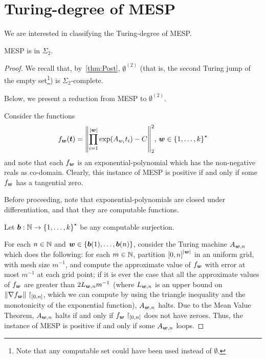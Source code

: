 \section{Turing-degree of MESP}
\label{sec:turing-degree-lics}

We are interested in classifying the Turing-degree of MESP\@.

\begin{theorem}
\label{thm:turing-degree-2}
  MESP is in $\Sigma_{2}$.
\end{theorem}

\begin{proof}
We recall that, by~\cref{thm:Post}, $\emptyset^{(2)}$ (that is, the second Turing jump of the empty set\footnote{Note that any computable set could have been used instead of $\emptyset$.}) is $\Sigma_{2}$-complete.

Below, we present a reduction from MESP to $\emptyset^{(2)}$.

Consider the functions
\begin{equation*}
    f_{\boldsymbol{w}}(\boldsymbol{t}) = {\left \| \prod \limits_{i=1}^{\lvert \boldsymbol{w} \rvert} \exp(A_{w_{i}} t_{i}) - C \right \|}_{2}^{2}, \, \boldsymbol{w} \in {\lbrace 1, \ldots, k \rbrace}^{\star}
\end{equation*}
and note that each $f_{\boldsymbol{w}}$ is an exponential-polynomial which has the non-negative reals as co-domain. Clearly, this instance of MESP is positive if and only if some $f_{\boldsymbol{w}}$ has a tangential zero.

Before proceeding, note that exponential-polynomials are closed under differentiation, and that they are computable functions.

Let $\boldsymbol{b} : \mathbb{N} \rightarrow {\lbrace 1, \ldots, k \rbrace}^{\star}$ be any computable surjection.

For each $n \in \mathbb{N}$ and $\boldsymbol{w} \in \lbrace \boldsymbol{b}(1), \ldots, \boldsymbol{b}(n) \rbrace$, consider the Turing machine $A_{\boldsymbol{w}, n}$ which does the following:
for each $m \in \mathbb{N}$, partition ${[0,n]}^{\lvert \boldsymbol{w} \rvert}$ in an uniform grid, with mesh size $m^{-1}$, and compute the approximate value of $f_{\boldsymbol{w}}$ with error at most $m^{-1}$ at each grid point;
if it is ever the case that all the approximate values of $f_{\boldsymbol{w}}$ are greater than $2 L_{\boldsymbol{w}, n} m^{-1}$ (where $L_{\boldsymbol{w}, n}$ is an upper bound on ${\| \nabla f_{\boldsymbol{w}} \|}\restriction_{[0,n]}$, which we can compute by using the triangle inequality and the monotonicity of the exponential function), $A_{\boldsymbol{w}, n}$ halts. Due to the Mean Value Theorem, $A_{\boldsymbol{w}, n}$ halts if and only if $f_{\boldsymbol{w}} \restriction_{[0,n]}$ does not have zeroes.
Thus, the instance of MESP is positive if and only if some $A_{\boldsymbol{w}, n}$ loops.


\end{proof}
